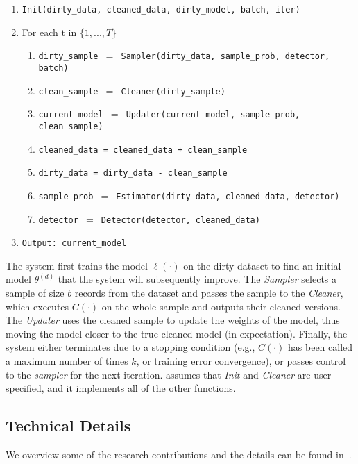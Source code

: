  \begin{enumerate}[leftmargin=1em]\scriptsize\sloppy
  \item \texttt{Init(dirty\_data, cleaned\_data, dirty\_model, batch, iter)}
  \item For each t in $\{1,...,T\}$
  \begin{enumerate}
    \item \texttt{dirty\_sample $=$ Sampler(dirty\_data, sample\_prob, detector, batch)}
    \item \texttt{clean\_sample $=$ Cleaner(dirty\_sample)}
    \item \texttt{current\_model $=$ Updater(current\_model, sample\_prob, clean\_sample)}
    \item \texttt{cleaned\_data = cleaned\_data + clean\_sample}
    \item \texttt{dirty\_data = dirty\_data - clean\_sample}
    \item \texttt{sample\_prob $=$ Estimator(dirty\_data, cleaned\_data, detector)}
    \item \texttt{detector $=$ Detector(detector, cleaned\_data)}
  \end{enumerate}
  \item \texttt{Output: current\_model}
  \end{enumerate}

The system first trains the model $\ell(\cdot)$ on the dirty dataset to find an initial model $\theta^{(d)}$ that the system will subsequently improve.
The {\it Sampler} selects a sample of size $b$ records from the dataset and passes
the sample to the {\it Cleaner}, which executes $C(\cdot)$ on the whole sample and outputs their cleaned versions.
The \emph{Updater} uses the cleaned sample to update the weights of the model, thus moving the model closer to the true cleaned model (in expectation).
Finally, the system either terminates due to a stopping condition (e.g., $C(\cdot)$ has been called a maximum number of times $k$, or training error convergence),
or passes control to the {\it sampler} for the next iteration.
\sys assumes that {\it Init} and {\it Cleaner} are user-specified, and it implements all of the other functions.

\subsection{Technical Details}
We overview some of the research contributions and the details can be found in~\cite{activecleanarxiv}.

  \vspace{0.5em}

